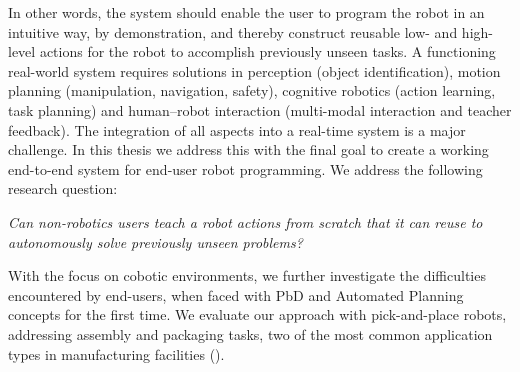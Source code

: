 In other words, the system should enable the user to program the robot in an intuitive way, \eg by demonstration, and thereby construct 
reusable low- and high-level actions for the robot to accomplish previously unseen tasks.
A functioning real-world system requires solutions in perception (\eg object identification), motion planning (\eg manipulation, navigation, safety),  cognitive robotics (\eg action learning, task planning) and human–robot interaction (\eg multi-modal interaction and teacher feedback). 
The integration of all aspects into a real-time system is a major challenge.
In this thesis we address this with the final goal to create a working end-to-end system for end-user robot programming.
We address the following research question:
\begin{center}
	\textit{Can non-robotics users teach a robot actions from scratch that it can reuse to autonomously solve previously unseen problems?}
\end{center}

With the focus on cobotic environments, we further investigate the difficulties encountered by end-users, when faced with PbD and Automated Planning concepts for the first time. 
We evaluate our approach with pick-and-place robots, addressing assembly and packaging tasks, two of the most common application types in manufacturing facilities (\cite{pickandplace}).

%


